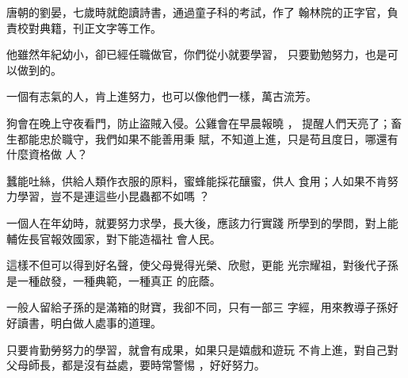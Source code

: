 \documentclass[avery5371,grid]{flashcards}
\begin{document}
{唐朝的劉晏，七歲時就飽讀詩書，通過童子科的考試，作了
翰林院的正字官，負責校對典籍，刊正文字等工作。} %
{} %

{他雖然年紀幼小，卻已經任職做官，你們從小就要學習，
只要勤勉努力，也是可以做到的。} %
{} %

{一個有志氣的人，肯上進努力，也可以像他們一樣，萬古流芳。} %
{} %






{狗會在晚上守夜看門，防止盜賊入侵。公雞會在早晨報曉 ，
提醒人們天亮了；畜生都能忠於職守，我們如果不能善用秉
賦，不知道上進，只是苟且度日，哪還有什麼資格做 人？} %
{} %

{蠶能吐絲，供給人類作衣服的原料，蜜蜂能採花釀蜜，供人
食用；人如果不肯努力學習，豈不是連這些小昆蟲都不如嗎
？} %
{} %

{一個人在年幼時，就要努力求學，長大後，應該力行實踐
所學到的學問，對上能輔佐長官報效國家，對下能造福社
會人民。} %
{} %

{這樣不但可以得到好名聲，使父母覺得光榮、欣慰，更能
光宗耀祖，對後代子孫是一種啟發，一種典範，一種真正
的庇蔭。} %
{} %

{一般人留給子孫的是滿箱的財寶，我卻不同，只有一部三
字經，用來教導子孫好好讀書，明白做人處事的道理。} %
{} %

{只要肯勤勞努力的學習，就會有成果，如果只是嬉戲和遊玩
不肯上進，對自己對父母師長，都是沒有益處，要時常警惕
，好好努力。} %
{} %
\end{document}
